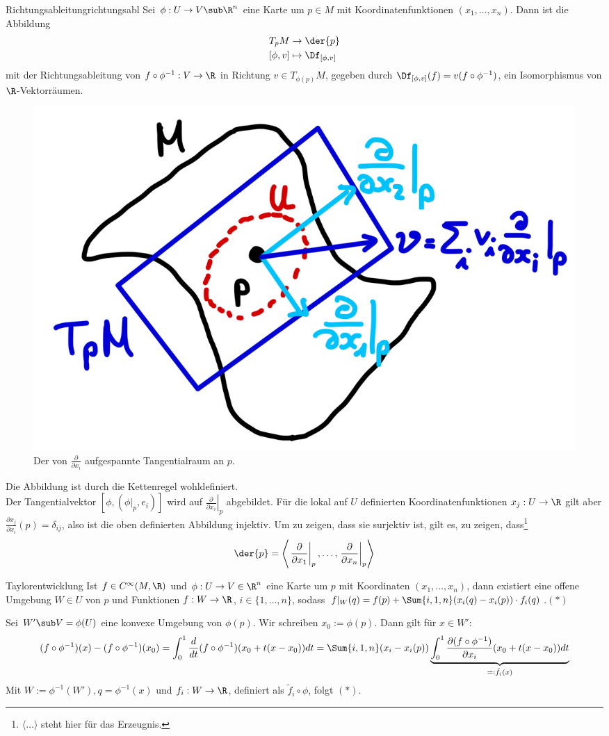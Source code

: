 \begin{satz}{Richtungsableitung}{richtungsabl}
Sei $\phi: U \to V \sub \R^n$ eine Karte um $p \in M$ mit Koordinatenfunktionen $(x_1, \dots, x_n)$. Dann ist die Abbildung 
\begin{align}
T_pM &\to \der{p} \\
[\phi, v] &\mapsto \Df_{[\phi, v]}
\end{align}
mit der Richtungsableitung von $f \circ \phi^{-1}: V \to \R$ in Richtung $v \in T_{\phi(p)}M$, gegeben durch $\Df_{[\phi, v]}(f) = v (f \circ \phi^{-1})$, ein Isomorphismus von $\R$-Vektorräumen.
\begin{figure}[H]
\label{fig:tangentialvek3}
\centering
\includegraphics[width=0.2\linewidth]{Bilder/tangentialvek3.png}
\caption{Der von $\frac{\partial}{\partial x_i}$ aufgespannte Tangentialraum an $p$.}
\end{figure}
\end{satz}
\begin{beweis}
Die Abbildung ist durch die Kettenregel wohldefiniert.\\
Der Tangentialvektor $[\phi, (\phi|_p, e_i)]$ wird auf $\left.\frac{\partial}{\partial x_i}\right|_p$ abgebildet. Für die lokal auf $U$ definierten Koordinatenfunktionen $x_j: U \to \R$ gilt aber $\frac{\partial x_j}{\partial x_i} (p) = \delta_{ij}$, also ist die oben definierten Abbildung injektiv. Um zu zeigen, dass sie surjektiv ist, gilt es, zu zeigen, dass\footnote{$\langle \dots \rangle$ steht hier für das Erzeugnis.}
\begin{equation}
\der{p} = \left\langle \left. \frac{\partial}{\partial x_1}\right|_p, \dots, \left. \frac{\partial}{\partial x_n}\right|_p \right\rangle
\end{equation}
\let\qed\relax
\end{beweis}
\begin{lemma}{Taylorentwicklung}{}
Ist $f \in C^\infty (M, \R)$ und $\phi: U \to V \in \R^n$ eine Karte um $p$ mit Koordinaten $(x_1, \dots, x_n)$, dann existiert eine offene Umgebung $W \in U$ von $p$ und Funktionen $f: W \to \R$, $i \in \{1, \dots, n \}$, sodass $f|_W (q) = f(p) + \Sum{i,1,n} (x_i(q)-x_i(p)) \cdot f_i(q)$.$(\ast)$
\end{lemma}
\begin{beweis}
Sei $W' \sub V = \phi(U)$ eine konvexe Umgebung von $\phi(p)$. Wir schreiben $x_0 := \phi(p)$. Dann gilt für $x \in W'$:
\begin{equation}
(f \circ \phi^{-1})(x)-(f \circ \phi^{-1})(x_0) = \int_0^1 \frac{d}{dt} (f \circ \phi^{-1})(x_0 + t(x-x_0)) dt = \Sum{i,1,n} (x_i - x_i(p)) \underbrace{\int_0^1 \frac{\partial(f \circ \phi^{-1})}{\partial x_i}(x_0 + t(x-x_0))dt}_{=:\tilde{f}_i(x)}
\end{equation}
Mit $W:= \phi^{-1}(W'), q= \phi^{-1}(x)$ und $f_i: W \to \R$, definiert als $\tilde{f}_i \circ \phi$, folgt $(\ast)$. 
\end{beweis}
